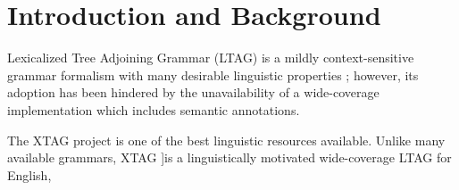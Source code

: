
\section{Introduction and Background}

Lexicalized Tree Adjoining Grammar (LTAG) is a mildly context-sensitive grammar formalism with many desirable linguistic properties \cite{ltag}; however, its adoption has been hindered by the unavailability of a wide-coverage implementation which includes semantic annotations.

The XTAG project is one of the best linguistic resources available. Unlike many available grammars, XTAG ]is a linguistically motivated wide-coverage LTAG for English, 